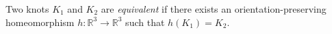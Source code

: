 Two knots $K_1$ and $K_2$ are \textit{equivalent} if there exists an orientation-preserving homeomorphism $h: \mathbb{R}^3 \to \mathbb{R}^3$ such that $h(K_1) = K_2$.
